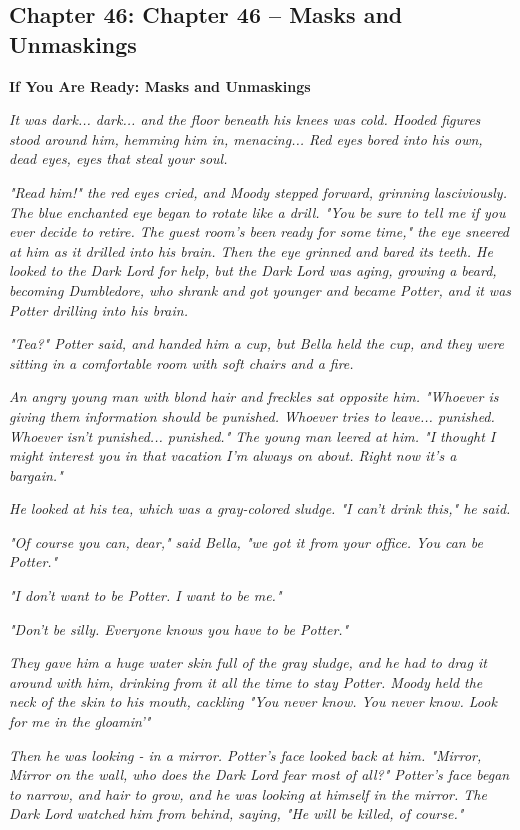 \documentclass[a4paper,11pt]{article}
\begin{document}
\subsection{Chapter 46: Chapter 46 – Masks and Unmaskings}

\textbf{If You Are Ready: Masks and Unmaskings}

\emph{It was dark... dark... and the floor beneath his knees was cold. Hooded figures stood around him, hemming him in, menacing... Red eyes bored into his own, dead eyes, eyes that steal your soul.}

\emph{"Read him!" the red eyes cried, and Moody stepped forward, grinning lasciviously. The blue enchanted eye began to rotate like a drill. "You be sure to tell me if you ever decide to retire. The guest room's been ready for some time," the eye sneered at him as it drilled into his brain. Then the eye grinned and bared its teeth. He looked to the Dark Lord for help, but the Dark Lord was aging, growing a beard, becoming Dumbledore, who shrank and got younger and became Potter, and it was Potter drilling into his brain.}

\emph{"Tea?" Potter said, and handed him a cup, but Bella held the cup, and they were sitting in a comfortable room with soft chairs and a fire.}

\emph{An angry young man with blond hair and freckles sat opposite him. "Whoever is giving them information should be punished. Whoever tries to leave... punished. Whoever isn't punished... punished." The young man leered at him. "I thought I might interest you in that vacation I'm always on about. Right now it's a bargain."}

\emph{He looked at his tea, which was a gray-colored sludge. "I can't drink this," he said.}

\emph{"Of course you can, dear," said Bella, "we got it from your office. You can be Potter."}

\emph{"I don't want to be Potter. I want to be me."}

\emph{"Don't be silly. Everyone knows you have to be Potter."}

\emph{They gave him a huge water skin full of the gray sludge, and he had to drag it around with him, drinking from it all the time to stay Potter. Moody held the neck of the skin to his mouth, cackling "You never know. You never know. Look for me in the gloamin'"}

\emph{Then he was looking - in a mirror. Potter's face looked back at him. "Mirror, Mirror on the wall, who does the Dark Lord fear most of all?" Potter's face began to narrow, and hair to grow, and he was looking at himself in the mirror. The Dark Lord watched him from behind, saying, "He will be killed, of course."}
\end{document}
